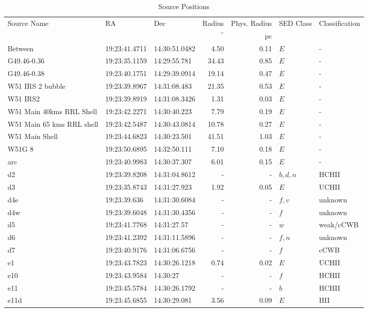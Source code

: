 \begin{table*}[htp]
\caption{Source Positions}
\begin{tabular}{lllrrll}
\label{tab:positions}
Source Name & RA & Dec & Radius & Phys. Radius & SED Class & Classification \\
 &  &  & $\mathrm{{}^{\prime\prime}}$ & $\mathrm{pc}$ &  &  \\
\hline
Between & 19:23:41.4711 & 14:30:51.0482 & 4.50 & 0.11 & $E$ & - \\
G49.46-0.36 & 19:23:35.1159 & 14:29:55.781 & 34.43 & 0.85 & $E$ & - \\
G49.46-0.38 & 19:23:40.1751 & 14:29:39.0914 & 19.14 & 0.47 & $E$ & - \\
W51 IRS 2 bubble & 19:23:39.8967 & 14:31:08.483 & 21.35 & 0.53 & $E$ & - \\
W51 IRS2 & 19:23:39.8919 & 14:31:08.3426 & 1.31 & 0.03 & $E$ & - \\
W51 Main 40kms RRL Shell & 19:23:42.2271 & 14:30:40.223 & 7.79 & 0.19 & $E$ & - \\
W51 Main 65 kms RRL shell & 19:23:42.5487 & 14:30:43.0814 & 10.78 & 0.27 & $E$ & - \\
W51 Main Shell & 19:23:44.6823 & 14:30:23.501 & 41.51 & 1.03 & $E$ & - \\
W51G 8 & 19:23:50.6895 & 14:32:50.111 & 7.10 & 0.18 & $E$ & - \\
arc & 19:23:40.9983 & 14:30:37.307 & 6.01 & 0.15 & $E$ & - \\
d2 & 19:23:39.8208 & 14:31:04.8612 & - & - & $b,d,n$ & HCHII \\
d3 & 19:23:35.8743 & 14:31:27.923 & 1.92 & 0.05 & $E$ & UCHII \\
d4e & 19:23:39.636 & 14:31:30.6084 & - & - & $f,v$ & unknown \\
d4w & 19:23:39.6048 & 14:31:30.4356 & - & - & $f$ & unknown \\
d5 & 19:23:41.7768 & 14:31:27.57 & - & - & $w$ & weak/cCWB \\
d6 & 19:23:41.2392 & 14:31:11.5896 & - & - & $f,n$ & unknown \\
d7 & 19:23:40.9176 & 14:31:06.6756 & - & - & $f$ & cCWB \\
e1 & 19:23:43.7823 & 14:30:26.1218 & 0.74 & 0.02 & $E$ & UCHII \\
e10 & 19:23:43.9584 & 14:30:27 & - & - & $f$ & HCHII \\
e11 & 19:23:45.5784 & 14:30:26.1792 & - & - & $b$ & HCHII \\
e11d & 19:23:45.6855 & 14:30:29.081 & 3.56 & 0.09 & $E$ & HII \\

\end{tabular}
\end{table*}
